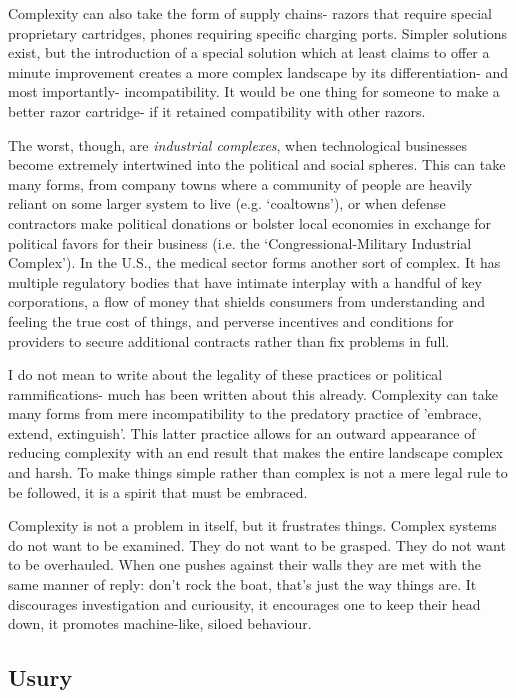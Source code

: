 \documentclass[letterpaper]{article}
\begin{document}
Complexity can also take the form of supply chains- razors that require special proprietary cartridges, phones requiring specific charging ports. Simpler solutions exist, but the introduction of a special solution which at least claims to offer a minute improvement creates a more complex landscape by its differentiation- and most importantly- incompatibility. It would be one thing for someone to make a better razor cartridge- if it retained compatibility with other razors.

The worst, though, are \textit{industrial complexes}, when technological businesses become extremely intertwined into the political and social spheres. This can take many forms, from company towns where a community of people are heavily reliant on some larger system to live (e.g. `coaltowns'), or when defense contractors make political donations or bolster local economies in exchange for political favors for their business (i.e. the `Congressional-Military Industrial Complex'). In the U.S., the medical sector forms another sort of complex. It has multiple regulatory bodies that have intimate interplay with a handful of key corporations, a flow of money that shields consumers from understanding and feeling the true cost of things, and perverse incentives and conditions for providers to secure additional contracts rather than fix problems in full.

I do not mean to write about the legality of these practices or political rammifications- much has been written about this already. Complexity can take many forms from mere incompatibility to the predatory practice of 'embrace, extend, extinguish'. This latter practice allows for an outward appearance of reducing complexity with an end result that makes the entire landscape complex and harsh. To make things simple rather than complex is not a mere legal rule to be followed, it is a spirit that must be embraced.

Complexity is not a problem in itself, but it frustrates things. Complex systems do not want to be examined. They do not want to be grasped. They do not want to be overhauled. When one pushes against their walls they are met with the same manner of reply: don't rock the boat, that's just the way things are. It discourages investigation and curiousity, it encourages one to keep their head down, it promotes machine-like, siloed behaviour.

\subsection{Usury}
\end{document}

